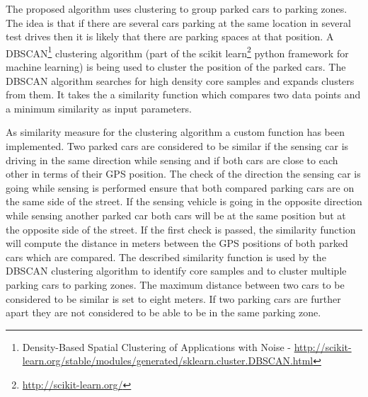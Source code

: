 The proposed algorithm uses clustering to group parked cars to parking zones. The idea is that if there are several cars parking at the same location in several test drives then it is likely that there are parking spaces at that position. A DBSCAN\footnote{Density-Based Spatial Clustering of Applications with Noise - \url{http://scikit-learn.org/stable/modules/generated/sklearn.cluster.DBSCAN.html}} clustering algorithm (part of the scikit learn\footnote{\url{http://scikit-learn.org/}} python framework for machine learning) is being used to cluster the position of the parked cars. The DBSCAN algorithm searches for high density core samples and expands clusters from them. It takes the a similarity function which compares two data points and a minimum similarity as input parameters.

As similarity measure for the clustering algorithm a custom function has been implemented. Two parked cars are considered to be similar if the sensing car is driving in the same direction while sensing and if both cars are close to each other in terms of their GPS position. The check of the direction the sensing car is going while sensing is performed ensure that both compared parking cars are on the same side of the street. If the sensing vehicle is going in the opposite direction while sensing another parked car both cars will be at the same position but at the opposite side of the street. If the first check is passed, the similarity function will compute the distance in meters between the GPS positions of both parked cars which are compared. The described similarity function is used by the DBSCAN clustering algorithm to identify core samples and to cluster multiple parking cars to parking zones. The maximum distance between two cars to be considered to be similar is set to eight meters. If two parking cars are further apart they are not considered to be able to be in the same parking zone.

%
%

